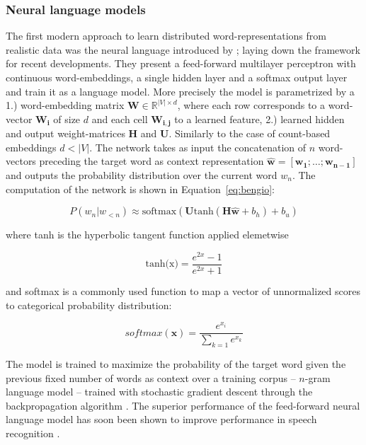 \subsubsection{Neural language models}
\label{sec:NNLM}
The first modern approach to learn distributed word-representations from realistic data
was the neural language introduced by \cite{bengio2003neural}; 
laying down the framework for recent developments.
They present a feed-forward multilayer perceptron with continuous word-embeddings,
a single hidden layer and a softmax output layer and train it as a language model.
More precisely the model is parametrized by a 1.) word-embedding matrix
$\mathbf{W} \in \mathbb{R}^{|V| \times d}$, where each row corresponds to a word-vector
$\mathbf{W_i}$ of size $d$ and each cell $\mathbf{W_{i,j}}$ to a learned feature, 2.)
learned hidden and output weight-matrices $\mathbf{H}$ and $\mathbf{U}$. Similarly
to the case of count-based embeddings $d < |V|$.
The network takes as input the concatenation of $n$ word-vectors preceding the target word as context
representation $\hat{\mathbf{w}} = [\mathbf{w_1}; \ldots; \mathbf{w_{n-1}}]$
and outputs the probability distribution over the current word $w_n$.
The computation of the network is shown in Equation~\ref{eq:bengio}:

\begin{equation}
\label{eq:bengio}
P(w_n|w_{<n}) \approx \text{softmax}(\mathbf{U} \text{tanh}(\mathbf{H} \mathbf{\hat{w}} + b_h ) + b_u)
\end{equation}

where tanh is the hyperbolic tangent function applied elemetwise

\begin{equation}
\label{eq:tanh}
\text{tanh(x)} = \frac{e^{2x} - 1 }{e^{2x} + 1 }
\end{equation}

and softmax is a commonly used function to map a vector of unnormalized scores to categorical probability 
distribution:

\begin{equation}
softmax(\mathbf{x}) = \frac{e^{x_{i}}}{\sum_{k=1} e^{x_k}}
\end{equation}

The model is trained to maximize the probability of
the target word given the previous fixed number of words as context over a training corpus
-- $n$-gram language model -- trained with stochastic gradient descent \citep{cauchy1847methode}
through the backpropagation algorithm \citep{rumelhart1985learning}.
The superior performance of the feed-forward neural language model has soon been shown to
improve performance in speech recognition \citep{schwenk2005training}.

